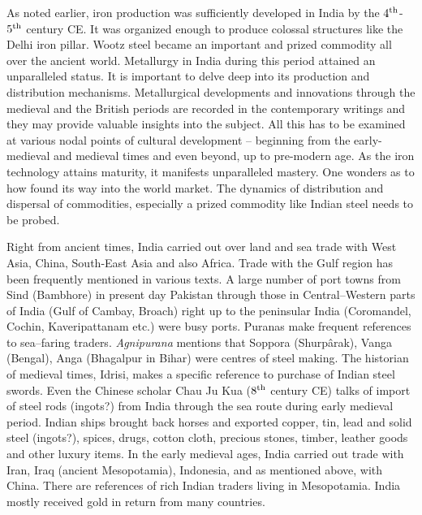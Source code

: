 As noted earlier, iron production was sufficiently developed in India by the $4^{\rm th}$-$5^{\rm th}$ century CE. It was organized enough to produce colossal structures like the Delhi iron pillar. Wootz steel became an important and prized commodity all over the ancient world. Metallurgy in India during this period attained an unparalleled status. It is important to delve deep into its production and distribution mechanisms. Metallurgical developments and innovations through the medieval and the British periods are recorded in the contemporary writings and they may provide valuable insights into the subject. All this has to be examined at various nodal points of cultural development – beginning from the early-medieval and medieval times and even beyond, up to pre-modern age. As the iron technology attains maturity, it manifests unparalleled mastery. One wonders as to how found its way into the world market. The dynamics of distribution and dispersal of commodities, especially a prized commodity like Indian steel needs to be probed.

Right from ancient times, India carried out over land and sea trade with West Asia, China, South-East Asia and also Africa. Trade with the Gulf region has been frequently mentioned in various texts. A large number of port towns from Sind (Bambhore) in present day Pakistan through those in Central–Western parts of India (Gulf of Cambay, Broach) right up to the peninsular India (Coromandel, Cochin, Kaveripattanam etc.) were busy ports. Puranas make frequent references to sea–faring traders. \textit{Agnipurana} mentions that Soppora (Shurpârak), Vanga (Bengal), Anga (Bhagalpur in Bihar) were centres of steel making. The historian of medieval times, Idrisi, makes a specific reference to purchase of Indian steel swords. Even the Chinese scholar Chau Ju Kua ($8^{\rm th}$ century CE) talks of import of steel rods (ingots?) from India through the sea route during early medieval period. Indian ships brought back horses and exported copper, tin, lead and solid steel (ingots?), spices, drugs, cotton cloth, precious stones, timber, leather goods and other luxury items. In the early medieval ages, India carried out trade with Iran, Iraq (ancient Mesopotamia), Indonesia, and as mentioned above, with China. There are references of rich Indian traders living in Mesopotamia. India mostly received gold in return from many countries.

\vspace{0.5cm}

